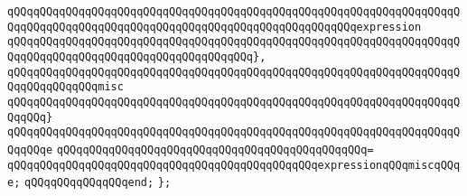\verb|qQQqqQQqqQQqqQQqqQQqqQQqqQQqqQQqqQQqqQQqqQQqqQQqqQQqqQQqqQQqqQQqqQQqqQQqqQQqqQQqqQQqqQQqqQQqqQQqqQQqqQQqqQQqqQQqqQQqqQQqqQQqexpression|\newline
\verb|qQQqqQQqqQQqqQQqqQQqqQQqqQQqqQQqqQQqqQQqqQQqqQQqqQQqqQQqqQQqqQQqqQQqqQQqqQQqqQQqqQQqqQQqqQQqqQQqqQQqqQQqqQQq},|\newline
\verb|qQQqqQQqqQQqqQQqqQQqqQQqqQQqqQQqqQQqqQQqqQQqqQQqqQQqqQQqqQQqqQQqqQQqqQQqqQQqqQQqqQQqmisc|\newline
\verb|qQQqqQQqqQQqqQQqqQQqqQQqqQQqqQQqqQQqqQQqqQQqqQQqqQQqqQQqqQQqqQQqqQQqqQQqqQQq}|\newline
\verb|qQQqqQQqqQQqqQQqqQQqqQQqqQQqqQQqqQQqqQQqqQQqqQQqqQQqqQQqqQQqqQQqqQQqqQQqqQQqe|\newline
\verb|qQQqqQQqqQQqqQQqqQQqqQQqqQQqqQQqqQQqqQQqqQQqqQQq=|\newline
\verb|qQQqqQQqqQQqqQQqqQQqqQQqqQQqqQQqqQQqqQQqqQQqqQQqexpressionqQQqmiscqQQqe;|\newline
\verb|qQQqqQQqqQQqqQQqend;|\newline
\verb|};|\newline
\newline

